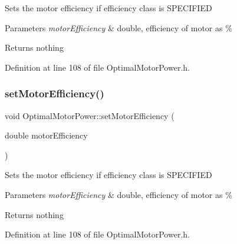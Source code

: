 Sets the motor efficiency if efficiency class is S\+P\+E\+C\+I\+F\+I\+ED


\begin{DoxyParams}{Parameters}
{\em motor\+Efficiency} & double, efficiency of motor as \%\\
\hline
\end{DoxyParams}
\begin{DoxyReturn}{Returns}
nothing 
\end{DoxyReturn}


Definition at line 108 of file Optimal\+Motor\+Power.\+h.

\mbox{\label{class_optimal_motor_power_a297acce2fcd06a57108fb52058a61cac}} 
\subsubsection{\texorpdfstring{set\+Motor\+Efficiency()}{setMotorEfficiency()}\hspace{0.1cm}{\footnotesize\ttfamily [3/3]}}
{\footnotesize\ttfamily void Optimal\+Motor\+Power\+::set\+Motor\+Efficiency (\begin{DoxyParamCaption}\item[{double}]{motor\+Efficiency }\end{DoxyParamCaption})\hspace{0.3cm}{\ttfamily [inline]}}

Sets the motor efficiency if efficiency class is S\+P\+E\+C\+I\+F\+I\+ED


\begin{DoxyParams}{Parameters}
{\em motor\+Efficiency} & double, efficiency of motor as \%\\
\hline
\end{DoxyParams}
\begin{DoxyReturn}{Returns}
nothing 
\end{DoxyReturn}


Definition at line 108 of file Optimal\+Motor\+Power.\+h.

\mbox{\label{class_optimal_motor_power_ada8a9e3caac34c54470ad13ffe7edf53}} 

